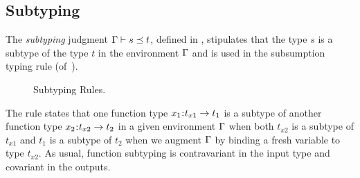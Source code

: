 \subsection{Subtyping}
\label{sec:typing:sub}

The \emph{subtyping} judgment ${{\mathrm{\Gamma}} \vdash s \preceq t}$, 
defined in , 
stipulates that the type $s$ is a subtype of
the type $t$ in the environment $\mathrm{\Gamma}$
and is used in the subsumption typing rule \tSub (of~).

\begin{figure}

\vspace{-0.00cm}
\caption{Subtyping Rules.}
\label{fig:s}
\label{fig:subtyping}
\label{fig:ent}
\vspace{-0.00cm}
\end{figure}
\begin{fullversion}  
    The rule \sFunc states that one function type $x_1\hspace{0.05em}{:}\hspace{0.05em} t_{x1} \rightarrow t_1$
    is a subtype of another function type $x_2\hspace{0.05em}{:}\hspace{0.05em} t_{x2} \rightarrow t_2$ in a
    given environment $\mathrm{\Gamma}$ when both $t_{x2}$ is a subtype of $t_{x1}$
    and $t_1$ is a subtype of $t_2$ when we augment $\mathrm{\Gamma}$ by
    binding a fresh variable to type $t_{x2}$.
    As usual, function subtyping is contravariant
    in the input type and covariant in the outputs.
\end{fullversion}

